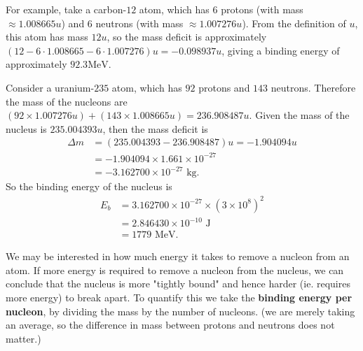 \begin{example}
For example, take a carbon-\(12\) atom, which has 6 protons (with mass \(\approx 1.008665u\)) and 6 neutrons (with mass \(\approx 1.007276u\)). From the definition of \(u\), this atom has mass \(12u\), so the mass deficit is approximately \((12 - 6 \cdot 1.008665 - 6 \cdot 1.007276)u = - 0.098937u\), giving a binding energy of approximately \(92.3 \textrm{MeV}\). 
\end{example}
\begin{example}
Consider a uranium-$235$ atom, which has $92$ protons and $143$ neutrons. Therefore the mass of the nucleons are $(92 \times 1.007276u) + (143 \times 1.008665u) = 236.908487u$. Given the mass of the nucleus is $235.004393u$, then the mass deficit is 
\begin{align}
    \Delta m &= (235.004393 - 236.908487)u = - 1.904094 u\\ 
    &= - 1.904094 \times 1.661 \times 10^{-27}\\ 
    &= - 3.162700 \times 10^{-27} \text{ kg}.
\end{align}
So the binding energy of the nucleus is 
\begin{align}
    E_b &= 3.162700 \times 10^{-27} \times (3 \times 10^8)^2 \\
    &= 2.846430 \times 10^{-10} \text{ J} \\
    &= 1779 \text{ MeV}.
\end{align}
\end{example}

We may be interested in how much energy it takes to remove a nucleon from an atom. If more energy is required to remove a nucleon from the nucleus, we can conclude that the nucleus is more "tightly bound" and hence harder (ie. requires more energy) to break apart. To quantify this we take the \textbf{binding energy per nucleon}, by dividing the mass by the number of nucleons. (we are merely taking an average, so the difference in mass between protons and neutrons does not matter.)  

